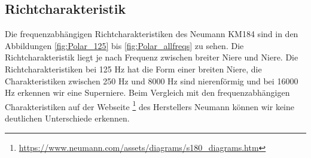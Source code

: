 \subsection{Richtcharakteristik}
Die frequenzabhängigen Richtcharakteristiken des Neumann KM184 sind in den Abbildungen \ref{fig:Polar_125} bis \ref{fig:Polar_allfreqs} zu sehen.
Die Richtcharakteristik liegt je nach Frequenz zwischen breiter Niere und Niere. 
Die Richtcharakteristiken bei 125 Hz hat die Form einer breiten Niere, die Charakteristiken zwischen 250 Hz und 8000 Hz sind nierenförmig und bei 16000 Hz erkennen wir eine Superniere.
Beim Vergleich mit den frequenzabhängigen Charakteristiken auf der Webseite \footnote{\url{https://www.neumann.com/assets/diagrams/s180_diagrams.htm}} des Herstellers Neumann können wir keine deutlichen Unterschiede erkennen.


